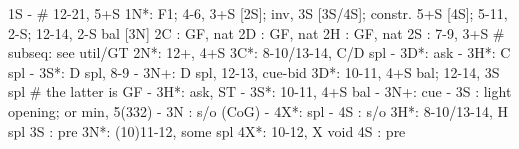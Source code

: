 1S -  # 12-21, 5+S
1N*: F1; 4-6, 3+S [2S]; inv, 3S [3S/4S]; constr. 5+S [4S]; 5-11, 2-S; 12-14, 2-S bal [3N]
2C : GF, nat
2D : GF, nat
2H : GF, nat
2S : 7-9, 3+S  # subseq: see util/GT
2N*: 12+, 4+S
3C*: 8-10/13-14, C/D spl
   - 3D*: ask
        - 3H*: C spl
        - 3S*: D spl, 8-9
        - 3N+: D spl, 12-13, cue-bid
3D*: 10-11, 4+S bal; 12-14, 3S spl  # the latter is GF
   - 3H*: ask, ST
        - 3S*: 10-11, 4+S bal
        - 3N+: cue
   - 3S : light opening; or min, 5(332)
   - 3N : s/o (CoG)
   - 4X*: spl
   - 4S : s/o
3H*: 8-10/13-14, H spl
3S : pre
3N*: (10)11-12, some spl
4X*: 10-12, X void
4S : pre